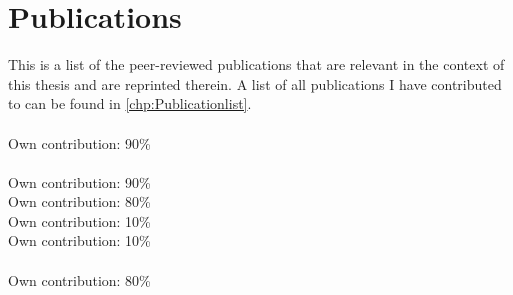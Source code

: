 \noindent
 
\chapter*{Publications}

This is a list of the peer-reviewed publications that are relevant in the context of this thesis and are reprinted therein. A list of all publications I have contributed to can be found in \autoref{chp:Publicationlist}.\\


\noindent{}\\ \hfill Own contribution: 90\%\\

\noindent{}\\ \hfill Own contribution: 90\%\\

\noindent{} \hfill Own contribution: 80\%\\

\noindent{} \hfill Own contribution: 10\%\\

\noindent{} \hfill Own contribution: 10\%\\

\noindent{}\\ \hfill Own contribution: 80\%

